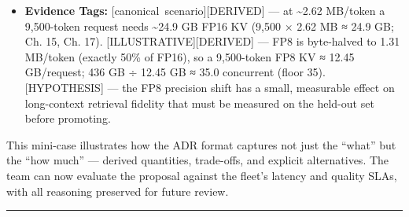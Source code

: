 \begin{itemize}
  \begin{enumerate}
  \def\labelenumi{\arabic{enumi}.}
  \tightlist
  \item
    \textbf{Add capacity} --- rejected as the first move: the canonical
    peak already needs 21 hosts on the KV screen (22 under the case (ii)
    prefill screen; Ch 16/17/20), so ``adding hosts beyond the 21''
    misunderstands the scale; relieving the memory ceiling by adding
    hosts multiplies the fleet cost (\textasciitilde\$7.4K/mo all-in per
    8×H100 host --- \textasciitilde\$5.8K/mo hardware amortization plus
    power, ops and staff, Ch 16 \hyperref[tab:16.1]{Table 16-1}), while FP8 KV relaxes the
    same ceiling without commissioning new hardware.
  \item
    \textbf{GQA (grouped-query attention) reduction} --- not available
    for the canonical model: the 70B reference geometry is full
    multi-head attention (64 KV-heads, 2.62 MB/token, Ch 7). Adopting
    GQA would cut KV per token by \textasciitilde8× (the largest single
    capacity lever in this book, Ch 16), but it changes the model
    architecture and requires retraining and re-evaluation --- it is
    outside a serving-only change. It is the right \emph{next-model}
    decision, not a knob on this deployment.
  \item
    \textbf{Prefix/context caching} --- complementary, not a substitute:
    it reduces prefill work and recomputation, but does not shrink the
    KV resident per active long-context request; retained alongside FP8
    KV.
  \end{enumerate}
\item
  \textbf{Evidence Tags:} \mbox{{[}canonical scenario{]}}\hspace{0pt}\mbox{{[}DERIVED{]}} --- at
  \textasciitilde2.62 MB/token a 9,500-token request needs
  \textasciitilde24.9 GB FP16 KV (9,500 × 2.62 MB ≈ 24.9 GB; Ch. 15, Ch.
  17). \mbox{{[}ILLUSTRATIVE{]}}\hspace{0pt}\mbox{{[}DERIVED{]}} --- FP8 is byte-halved to 1.31
  MB/token (exactly 50\% of FP16), so a 9,500-token FP8 KV ≈ 12.45
  GB/request; 436 GB ÷ 12.45 GB ≈ 35.0 concurrent (floor 35).
  \mbox{{[}HYPOTHESIS{]}} --- the FP8 precision shift has a small, measurable
  effect on long-context retrieval fidelity that must be measured on the
  held-out set before promoting.
\end{itemize}

This mini-case illustrates how the ADR format captures not just the
``what'' but the ``how much'' --- derived quantities, trade-offs, and
explicit alternatives. The team can now evaluate the proposal against
the fleet's latency and quality SLAs, with all reasoning preserved for
future review.

\begin{center}\rule{0.5\linewidth}{0.5pt}\end{center}
